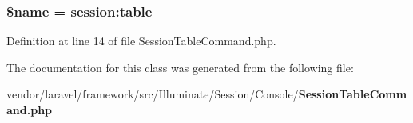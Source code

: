\subsubsection[{\$name}]{\setlength{\rightskip}{0pt plus 5cm}\${\bf name} = \textquotesingle{}session\+:table\textquotesingle{}\hspace{0.3cm}{\ttfamily [protected]}}\label{class_illuminate_1_1_session_1_1_console_1_1_session_table_command_ab2fc40d43824ea3e1ce5d86dee0d763b}


Definition at line 14 of file Session\+Table\+Command.\+php.



The documentation for this class was generated from the following file\+:\begin{DoxyCompactItemize}
\item 
vendor/laravel/framework/src/\+Illuminate/\+Session/\+Console/{\bf Session\+Table\+Command.\+php}\end{DoxyCompactItemize}
